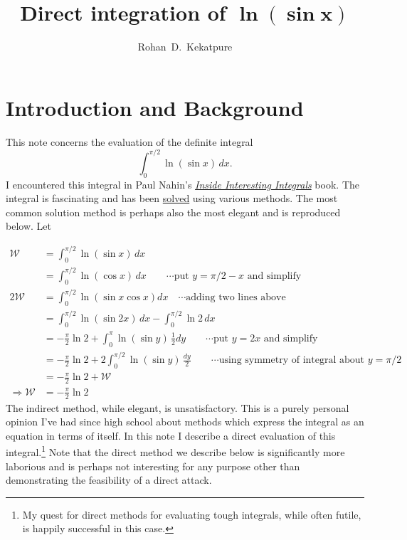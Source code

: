 \documentclass[11pt,oneside,reqno]{amsart}
\title{Direct integration of $\bm{\ln(\sin x)}$}
\author{Rohan~D.~Kekatpure}
\begin{document}
\maketitle


\section{Introduction and Background}
\noindent This note concerns the evaluation of the definite integral
\begin{equation*}
\int_0^{\pi/2} \ln(\sin x)\, dx.
\end{equation*}
I encountered this integral in Paul Nahin's \href{http://tinyurl.com/kr45hy33}{{\em Inside Interesting Integrals}} book. The integral is fascinating and has been \href{http://tinyurl.com/mt2cvbzf}{solved} using various methods. The most common solution method is perhaps also the most elegant and is reproduced below. Let

\begin{align*}
	\mathcal{W} &= \int_0^{\pi/2} \ln(\sin x) \,dx \\
	&= \int_0^{\pi/2} \ln(\cos x) \,dx \qquad\cdots \text{put $y = \pi/2 - x$ and simplify} \\
	2\mathcal{W} &= \int_0^{\pi/2} \ln(\sin x \cos x) dx \quad \cdots \text{adding two lines above} \\
	&= \int_0^{\pi/2} \ln(\sin 2x)\,dx - \int_0^{\pi/2} \ln 2\,dx \\
	&= -\frac{\pi}{2}\ln 2 + \int_0^{\pi} \ln(\sin y)\,\frac{1}{2}dy \qquad\cdots \text{put $y = 2x$ and simplify} \\
	&= -\frac{\pi}{2}\ln 2 + 2 \int_0^{\pi/2} \ln(\sin y)\,\frac{dy}{2} \qquad\cdots \text{using symmetry of integral about $y=\pi/2$} \\	
	&= -\frac{\pi}{2}\ln 2 + \mathcal{W}\\
	\Rightarrow \mathcal{W}&= -\frac{\pi}{2}\ln 2
\end{align*}
\noindent The indirect method, while elegant, is unsatisfactory. This is a purely personal opinion I've had since high school about methods which express the integral as an equation in terms of itself. In this note I describe a direct evaluation of this integral.\footnote{My quest for direct methods for evaluating tough integrals, while often futile, is happily successful in this case.} Note that the direct method we describe below is significantly more laborious and is perhaps not interesting for any purpose other than demonstrating the feasibility of a direct attack.
%
\end{document}

